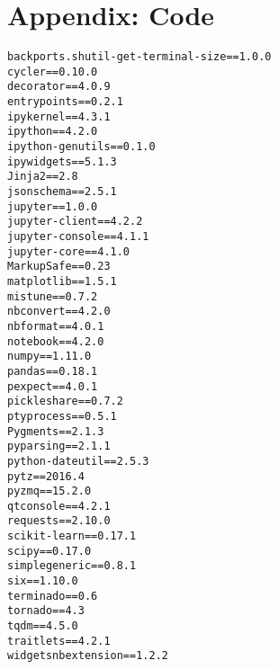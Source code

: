 \section{Appendix: Code}















\begin{lstlisting}[caption=Required Python libraries and versions]
backports.shutil-get-terminal-size==1.0.0
cycler==0.10.0
decorator==4.0.9
entrypoints==0.2.1
ipykernel==4.3.1
ipython==4.2.0
ipython-genutils==0.1.0
ipywidgets==5.1.3
Jinja2==2.8
jsonschema==2.5.1
jupyter==1.0.0
jupyter-client==4.2.2
jupyter-console==4.1.1
jupyter-core==4.1.0
MarkupSafe==0.23
matplotlib==1.5.1
mistune==0.7.2
nbconvert==4.2.0
nbformat==4.0.1
notebook==4.2.0
numpy==1.11.0
pandas==0.18.1
pexpect==4.0.1
pickleshare==0.7.2
ptyprocess==0.5.1
Pygments==2.1.3
pyparsing==2.1.1
python-dateutil==2.5.3
pytz==2016.4
pyzmq==15.2.0
qtconsole==4.2.1
requests==2.10.0
scikit-learn==0.17.1
scipy==0.17.0
simplegeneric==0.8.1
six==1.10.0
terminado==0.6
tornado==4.3
tqdm==4.5.0
traitlets==4.2.1
widgetsnbextension==1.2.2
\end{lstlisting}




